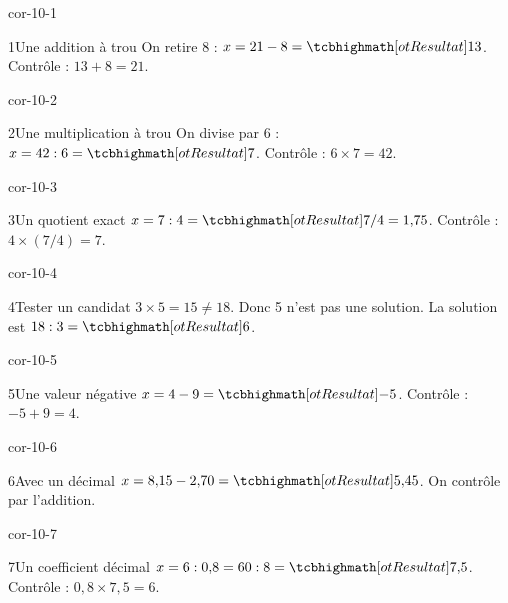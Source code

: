 \clearpage\pagestyle{otMain}\setlength{\otBlocEspacement}{2.5mm}\fontsize{11}{15}\selectfont{}
\begin{blocLivre}{cor-10-1}\begin{corrige}{1}{Une addition à trou}
On retire 8 : $x=21-8=\res{13}$. Contrôle : $13+8=21$.
\end{corrige}\end{blocLivre}
\begin{blocLivre}{cor-10-2}\begin{corrige}{2}{Une multiplication à trou}
On divise par 6 : $x=42:6=\res7$. Contrôle : $6\times7=42$.
\end{corrige}\end{blocLivre}
\begin{blocLivre}{cor-10-3}\begin{corrige}{3}{Un quotient exact}
$x=7:4=\res{7/4=1{,}75}$. Contrôle : $4\times(7/4)=7$.
\end{corrige}\end{blocLivre}
\begin{blocLivre}{cor-10-4}\begin{corrige}{4}{Tester un candidat}
$3\times5=15\ne18$. Donc 5 n’est pas une solution. La solution est $18:3=\res6$.
\end{corrige}\end{blocLivre}
\begin{blocLivre}{cor-10-5}\begin{corrige}{5}{Une valeur négative}
$x=4-9=\res{-5}$. Contrôle : $-5+9=4$.
\end{corrige}\end{blocLivre}
\begin{blocLivre}{cor-10-6}\begin{corrige}{6}{Avec un décimal}
$x=8{,}15-2{,}70=\res{5{,}45}$. On contrôle par l’addition.
\end{corrige}\end{blocLivre}
\begin{blocLivre}{cor-10-7}\begin{corrige}{7}{Un coefficient décimal}
$x=6:0{,}8=60:8=\res{7{,}5}$. Contrôle : $0{,}8\times7{,}5=6$.
\end{corrige}\end{blocLivre}
